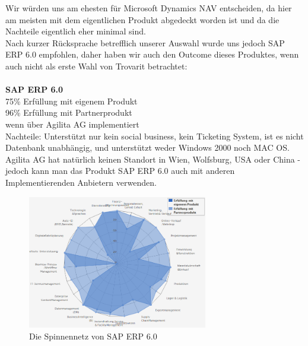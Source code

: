 \documentclass[12pt]{article}
\begin{document}
Wir würden uns am ehesten für Microsoft Dynamics NAV entscheiden, da hier am meisten mit dem eigentlichen Produkt abgedeckt worden ist und da die Nachteile eigentlich eher minimal sind.\\
Nach kurzer Rücksprache betrefflich unserer Auswahl wurde uns jedoch SAP ERP 6.0 empfohlen, daher haben wir auch den Outcome dieses Produktes, wenn auch nicht als erste Wahl von Trovarit betrachtet:
 \\ \\
\textbf{ SAP ERP 6.0}\\
		75\% Erfüllung mit eigenem Produkt\\
		96\% Erfüllung mit Partnerprodukt\\				
		wenn über Agilita AG implementiert\\
		Nachteile: Unterstützt nur kein social business, kein Ticketing System, ist es nicht Datenbank unabhängig, und unterstützt weder Windows 2000 noch MAC OS. Agilita AG hat natürlich keinen Standort in Wien, Wolfsburg, USA oder China - jedoch kann man das Produkt SAP ERP 6.0 auch mit anderen Implementierenden Anbietern verwenden.
		
\FloatBarrier
\begin{figure}[here!]
\centering
\includegraphics[width=0.7\textwidth]{images/SAPBussinesNEU}
\caption{Die Spinnennetz von SAP ERP 6.0}
\end{figure}\FloatBarrier

\end{document}
